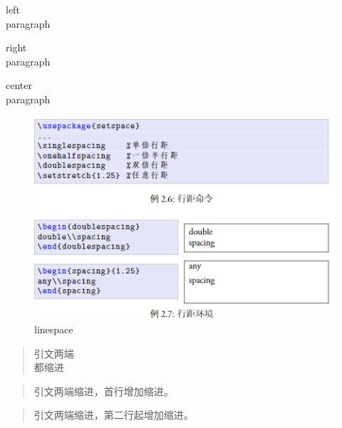 \documentclass[UTF8]{article}
\begin{document}

\begin{flushleft}left\\paragraph\end{flushleft} %
\begin{flushright}right\\paragraph\end{flushright} %
\begin{center}center\\paragraph\end{center} %



\begin{figure}
	\centering
	\includegraphics[width=1.0\textwidth]{linespace.png} %
	\caption{linespace} %
	\label{img} %
\end{figure}


\begin{quote}
	引文两端\\都缩进
\end{quote}
\begin{quotation}
	引文两端缩进，首行增加缩进。
\end{quotation}
\begin{verse}
	引文两端缩进，第二行起增加缩进。
\end{verse}
\end{document}
